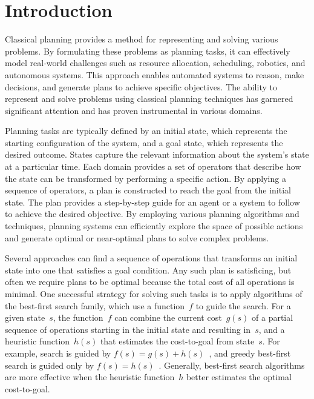 \chapter{Introduction}
\label{sec:intro}

Classical planning provides a method for representing and solving various problems. By formulating these problems as planning tasks, it can effectively model real-world challenges such as resource allocation, scheduling, robotics, and autonomous systems. This approach enables automated systems to reason, make decisions, and generate plans to achieve specific objectives. The ability to represent and solve problems using classical planning techniques has garnered significant attention and has proven instrumental in various domains.

Planning tasks are typically defined by an initial state, which represents the starting configuration of the system, and a goal state, which represents the desired outcome. States capture the relevant information about the system's state at a particular time. Each domain provides a set of operators that describe how the state can be transformed by performing a specific action. By applying a sequence of operators, a plan is constructed to reach the goal from the initial state. The plan provides a step-by-step guide for an agent or a system to follow to achieve the desired objective. By employing various planning algorithms and techniques, planning systems can efficiently explore the space of possible actions and generate optimal or near-optimal plans to solve complex problems.

Several approaches can find a sequence of operations that transforms an initial state into one that satisfies a goal condition. Any such plan is satisficing, but often we require plans to be optimal because the total cost of all operations is minimal. One successful strategy for solving such tasks is to apply algorithms of the best-first search family, which use a function~$f$ to guide the search. For a given state~$s$, the function~$f$ can combine the current cost~$g(s)$ of a partial sequence of operations starting in the initial state and resulting in~$s$, and a heuristic function~$h(s)$ that estimates the cost-to-goal from state~$s$. For example, \astar search is guided by $f(s)=g(s)+h(s)$~\cite{hart-et-al-ieeessc1968}, and greedy best-first search is guided only by $f(s)=h(s)$~\cite{doran-michie-rsl1966}. Generally, best-first search algorithms are more effective when the heuristic function~$h$ better estimates the optimal cost-to-goal.

